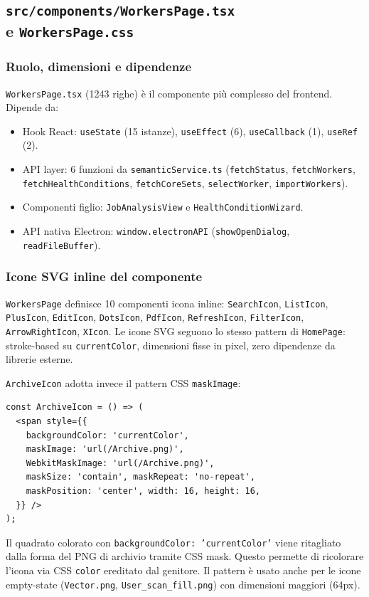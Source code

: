 \documentclass[a4paper,12pt]{article}
\begin{document}
\subsection[\texttt{src/components/WorkersPage.tsx} e \texttt{WorkersPage.css}]{\texttt{src/components/WorkersPage.tsx}\\[2pt]e \texttt{WorkersPage.css}}

\subsubsection{Ruolo, dimensioni e dipendenze}

\texttt{WorkersPage.tsx} (1243 righe) \`{e} il componente pi\`{u} complesso
del frontend. Dipende da:
\begin{itemize}[noitemsep]
  \item Hook React: \texttt{useState} (15 istanze), \texttt{useEffect} (6),
        \texttt{useCallback} (1), \texttt{useRef} (2).
  \item API layer: 6 funzioni da \texttt{semanticService.ts}
        (\texttt{fetchStatus}, \texttt{fetchWorkers},
        \texttt{fetchHealthConditions}, \texttt{fetchCoreSets},
        \texttt{selectWorker}, \texttt{importWorkers}).
  \item Componenti figlio: \texttt{JobAnalysisView} e
        \texttt{HealthConditionWizard}.
  \item API nativa Electron: \texttt{window.electronAPI}
        (\texttt{showOpenDialog}, \texttt{readFileBuffer}).
\end{itemize}

\subsubsection{Icone SVG inline del componente}

\texttt{WorkersPage} definisce 10 componenti icona inline:
\texttt{SearchIcon}, \texttt{ListIcon}, \texttt{PlusIcon},
\texttt{EditIcon}, \texttt{DotsIcon}, \texttt{PdfIcon},
\texttt{RefreshIcon}, \texttt{FilterIcon}, \texttt{ArrowRightIcon},
\texttt{XIcon}. Le icone SVG seguono lo stesso pattern di
\texttt{HomePage}: stroke-based su \texttt{currentColor}, dimensioni
fisse in pixel, zero dipendenze da librerie esterne.

\texttt{ArchiveIcon} adotta invece il pattern CSS \texttt{maskImage}:
\begin{lstlisting}
const ArchiveIcon = () => (
  <span style={{
    backgroundColor: 'currentColor',
    maskImage: 'url(/Archive.png)',
    WebkitMaskImage: 'url(/Archive.png)',
    maskSize: 'contain', maskRepeat: 'no-repeat',
    maskPosition: 'center', width: 16, height: 16,
  }} />
);
\end{lstlisting}
Il quadrato colorato con \texttt{backgroundColor: 'currentColor'}
viene ritagliato dalla forma del PNG di archivio tramite CSS mask.
Questo permette di ricolorare l'icona via CSS \texttt{color} ereditato
dal genitore. Il pattern \`{e} usato anche per le icone empty-state
(\texttt{Vector.png}, \texttt{User\_scan\_fill.png}) con dimensioni
maggiori (64px).
\end{document}
